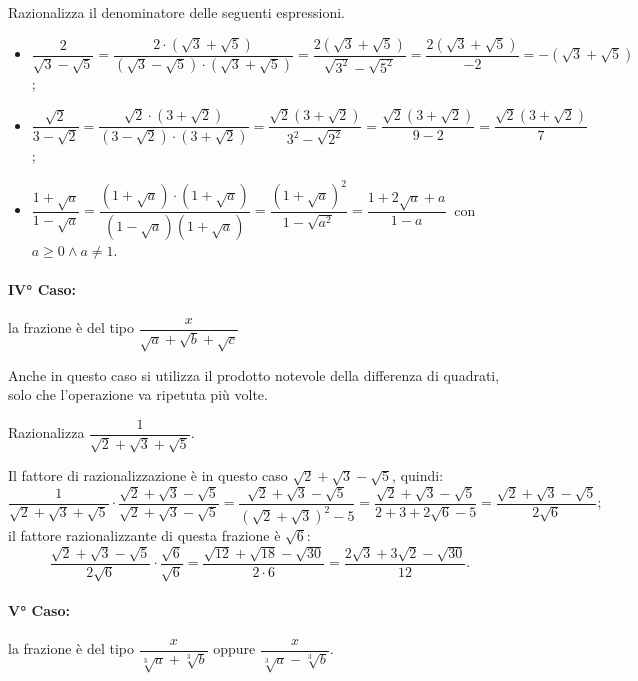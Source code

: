 \begin{exrig}
 \begin{esempio}
Razionalizza il denominatore delle seguenti espressioni.
\begin{itemize}
 \item $\dfrac 2{\sqrt 3-\sqrt 5}=\dfrac{2\cdot (\sqrt 3+\sqrt 5)}{(\sqrt 3-\sqrt 5)\cdot (\sqrt 3+\sqrt 5)}=\dfrac{2(\sqrt 3+\sqrt 5)}{\sqrt{3^2}-\sqrt{5^2}}=\dfrac{2(\sqrt 3+\sqrt 5)}{-2}=-(\sqrt 3+\sqrt 5)$;
 \item $\dfrac{\sqrt 2}{3-\sqrt 2}=\dfrac{\sqrt 2\cdot (3+\sqrt 2)}{(3-\sqrt 2)\cdot (3+\sqrt 2)}=\dfrac{\sqrt 2(3+\sqrt 2)}{3^2-\sqrt{2^2}}=\dfrac{\sqrt 2(3+\sqrt 2)}{9-2}=\dfrac{\sqrt 2(3+\sqrt 2)} 7$;
 \item $\dfrac{1+\sqrt a}{1-\sqrt a}=\dfrac{(1+\sqrt a)\cdot (1+\sqrt a)}{(1-\sqrt a)(1+\sqrt a)}=\dfrac{(1+\sqrt a)^2}{1-\sqrt{a^2}}=\dfrac{1+2\sqrt a+a}{1-a}\:$ con $a\ge 0\wedge a\neq 1$.
\end{itemize}
 \end{esempio}
\end{exrig}

\paragraph{IV° Caso:} la frazione è del tipo $\dfrac x{\sqrt a+\sqrt b+\sqrt c}$

Anche in questo caso si utilizza il prodotto notevole della differenza di quadrati, solo che l'operazione va ripetuta più volte.

\begin{exrig}
 \begin{esempio}
Razionalizza $\dfrac 1{\sqrt 2+\sqrt 3+\sqrt 5}$.

Il fattore di razionalizzazione è in questo caso $\sqrt 2+\sqrt 3-\sqrt 5$, quindi:
 \[\dfrac 1{\sqrt 2+\sqrt 3+\sqrt 5}\cdot \dfrac{\sqrt 2+\sqrt 3-\sqrt 5}{\sqrt 2+\sqrt 3-\sqrt 5}=\dfrac{\sqrt 2+\sqrt 3-\sqrt 5}{(\sqrt 2+\sqrt 3)^2-5}=\dfrac{\sqrt 2+\sqrt 3-\sqrt 5}{2+3+2\sqrt 6-5}=\dfrac{\sqrt 2+\sqrt 3-\sqrt 5}{2\sqrt 6};\]
 il fattore razionalizzante di questa frazione è $\sqrt 6$:
 \[\dfrac{\sqrt 2+\sqrt 3-\sqrt 5}{2\sqrt 6}\cdot \dfrac{\sqrt 6}{\sqrt 6}=\dfrac{\sqrt{12}+\sqrt{18}-\sqrt{30}}{2\cdot 6}=\dfrac{2\sqrt 3+3\sqrt 2-\sqrt{30}}{12}.\]
 \end{esempio}
\end{exrig}

\paragraph{V° Caso:} la frazione è del tipo $\dfrac x{\sqrt[3]a+\sqrt[3]b}$ oppure $\dfrac x{\sqrt[3]a-\sqrt[3]b}$.

